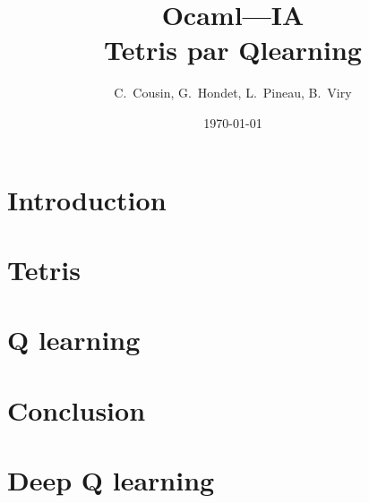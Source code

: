 \documentclass{article}
\title{Ocaml---IA\\Tetris par Qlearning}
\author{C.~Cousin, G.~Hondet, L.~Pineau, B.~Viry}
\date{\today}
\begin{document}
\maketitle
\tableofcontents


\section*{Introduction}

\section{Tetris}

\section{Q learning}

\section*{Conclusion}

\appendix
\section{Deep Q learning}
\end{document}
